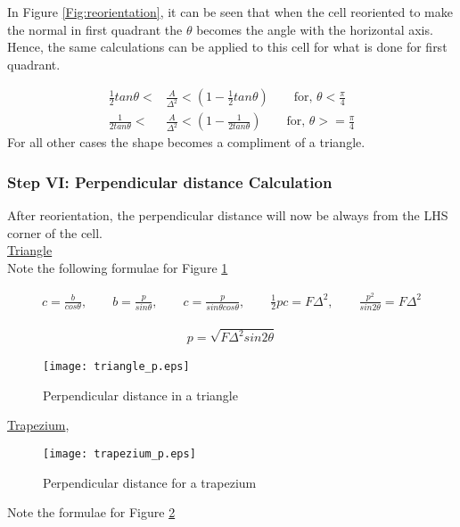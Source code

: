 In Figure \ref{Fig:reorientation}, it can be seen that when the cell reoriented to make the normal in first quadrant the $\theta$ becomes the angle with the horizontal axis.
Hence, the same calculations can be applied to this cell for what is done for first quadrant. 

\begin{equation*}
\boxed { \begin{align}
 \frac{1}{2} tan\theta <& \frac{A}{\Delta^2}< \left(1-\frac{1}{2} tan\theta\right)  \qquad \text{for, } \theta < \frac{\pi}{4} \nonumber	\\    
   \frac{1}{2tan\theta} <&   \frac{A}{\Delta^2}< \left(1-\frac{1}{2tan\theta}\right) \qquad \text{for, }  \theta >= \frac{\pi}{4}	
   \end{align}}
\end{equation*}
For all other cases the shape becomes a compliment of a triangle.

\subsubsection{Step VI: Perpendicular distance Calculation }
After reorientation, the perpendicular distance will now be always from the LHS corner of the cell.\\
\underline{Triangle}\\
Note the following formulae for Figure \ref{Fig:trianlge_p}

\begin{eqnarray*}
c=\frac{b}{cos\theta},
\qquad b=\frac{p}{sin\theta},  
\qquad  c=\frac{p}{sin\theta cos\theta},
\qquad   \frac{1}{2}pc=F\Delta^2,
\qquad  \frac{p^2}{sin2\theta}=F\Delta^2 \nonumber
\end{eqnarray*}

\begin{equation*}
\boxed{ \begin{align}
  p=\sqrt{F\Delta^2sin2\theta}
  \end{align} }
\end{equation*}
  
\begin{figure}
\centering
 \texttt{[image: triangle\_p.eps]}
 \caption{Perpendicular distance in a triangle}
 \label{Fig:trianlge_p}
\end{figure}

\underline{Trapezium}, \\
  \begin{figure}
  \centering
    \texttt{[image: trapezium\_p.eps]}
    \caption{Perpendicular distance for a trapezium}
    \label{Fig:trapezium_p}
  \end{figure}
  Note the formulae for Figure \ref{Fig:trapezium_p}
  
